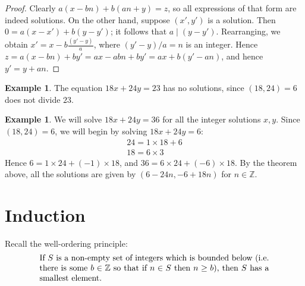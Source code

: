 \documentclass[a4paper,leqno]{article}
\numberwithin{equation}{section}
\theoremstyle{definition}
\newtheorem{ex}[equation]{Example}
\theoremstyle{remark}
\begin{document}
\begin{proof}
  Clearly $ a(x - bn) + b(an + y) = z $, so all expressions of that form are indeed solutions. On the other hand, suppose $ (x', y') $
  is a solution. Then $ 0 = a(x - x') + b(y - y') $; it follows that $ a \mid (y - y') $. Rearranging, we obtain $ x' = x - b\frac{(y' - y)}{a} $,
  where $ (y' - y)/a = n $ is an integer. Hence $ z = a(x - bn) + by' = ax - abn + by' = ax + b(y' - an) $, and hence $ y' = y + an $.
\end{proof}

\begin{ex}
  The equation $ 18x + 24y = 23 $ has no solutions, since $ (18,24) = 6 $ does not divide $ 23 $.
\end{ex}
\begin{ex}
  We will solve $ 18x + 24y = 36 $ for all the integer solutions $ x, y $. Since $ (18,24) = 6 $, we will begin by solving $ 18x + 24y = 6 $:
  \begin{align*}
    24 = 1 \times 18 + 6\\
    18 = 6 \times 3
  \end{align*}
  Hence $ 6 = 1 \times 24 + (-1) \times 18 $, and $ 36 = 6 \times 24 + (-6) \times 18 $. By the theorem above, all the solutions are
  given by $ (6 - 24n, -6 + 18n) $ for $ n \in \mathbb{Z} $.
\end{ex}

\section{Induction}
Recall the well-ordering principle:
\begin{equation}
  \begin{minipage}{0.8\textwidth}
    If $ S $ is a non-empty set of integers which is bounded below (i.e. there is some $ b \in \mathbb{Z} $ so that
    if $ n \in S $ then $ n \geq b $), then $ S $ has a smallest element.
  \end{minipage}
\end{equation}
\end{document}
